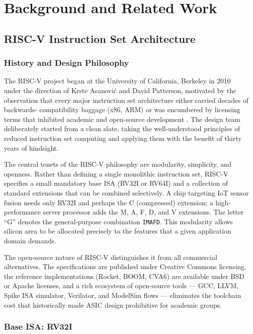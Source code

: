 \chapter{Background and Related Work}
\label{ch:background}

\section{RISC-V Instruction Set Architecture}
\label{sec:riscv-isa}

\subsection{History and Design Philosophy}

The RISC-V project began at the University of California, Berkeley in 2010 under
the direction of Krste Asanović and David Patterson, motivated by the observation
that every major instruction set architecture either carried decades of backwards-
compatibility baggage (x86, ARM) or was encumbered by licensing terms that inhibited
academic and open-source development \cite{patterson2020risc}. The design team
deliberately started from a clean slate, taking the well-understood principles of
reduced instruction set computing and applying them with the benefit of thirty years
of hindsight.

The central tenets of the RISC-V philosophy are modularity, simplicity, and openness.
Rather than defining a single monolithic instruction set, RISC-V specifies a small
mandatory base ISA (RV32I or RV64I) and a collection of standard extensions that can
be combined selectively. A chip targeting IoT sensor fusion needs only RV32I and
perhaps the C (compressed) extension; a high-performance server processor adds the M,
A, F, D, and V extensions. The letter ``G'' denotes the general-purpose combination
\texttt{IMAFD}. This modularity allows silicon area to be allocated precisely to the
features that a given application domain demands.

The open-source nature of RISC-V distinguishes it from all commercial alternatives.
The specifications are published under Creative Commons licensing, the reference
implementations (Rocket, BOOM, CVA6) are available under BSD or Apache licenses, and
a rich ecosystem of open-source tools --- GCC, LLVM, Spike ISA simulator, Verilator,
and ModelSim flows --- eliminates the toolchain cost that historically made ASIC design
prohibitive for academic groups.

\subsection{Base ISA: RV32I}

